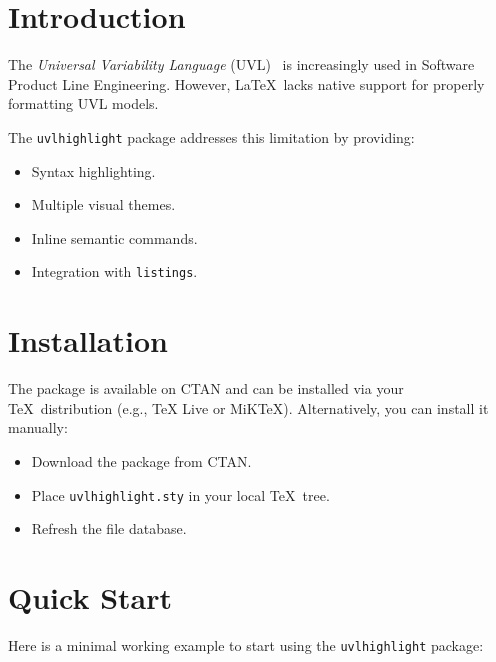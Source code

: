 \tableofcontents
\newpage

\section{Introduction}
The \emph{Universal Variability Language} (UVL)~\cite{Benavides2025_UVL} is increasingly used in
Software Product Line Engineering. However, \LaTeX\ lacks native support for properly formatting UVL models.

The \texttt{uvlhighlight} package addresses this limitation by providing:
\begin{itemize}
    \item Syntax highlighting.
    \item Multiple visual themes.
    \item Inline semantic commands.
    \item Integration with \texttt{listings}.
\end{itemize}

\section{Installation}
The package is available on CTAN and can be installed via your \TeX\ distribution
(e.g., TeX Live or MiKTeX). Alternatively, you can install it manually:

\begin{itemize}
    \item Download the package from CTAN.
    \item Place \texttt{uvlhighlight.sty} in your local \TeX\ tree.
    \item Refresh the file database.
\end{itemize}


\section{Quick Start}
Here is a minimal working example to start using the \texttt{uvlhighlight} package:

